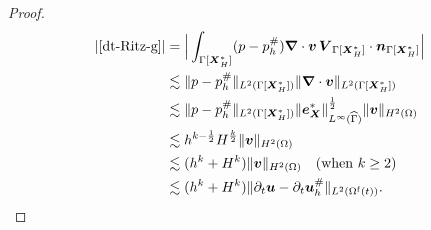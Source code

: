 \documentclass[11pt,reqno]{amsart}
\theoremstyle{definition}
\theoremstyle{plain}
\numberwithin{theorem}{section}
\numberwithin{proposition}{section}
\numberwithin{lemma}{section}
\numberwithin{equation}{section}
\newcommand{\bs}[1]{\boldsymbol{#1}}
\newcommand{\uu}[1]  {{\bs{#1}} }
\newcommand{\grad}   { \uu{\nabla}    }
\def\d{\mathrm{d}}
\renewcommand{\(}{\bigl(}
\renewcommand{\)}{\bigr)}
\begin{document}
\begin{proof}
\begin{align*}
|\eqref{dt-Ritz-g}|
&=\Big|\int_{\Gamma[{\bs X}_H^*]} ( p - p_h^\# ) \grad\cdot{\bs v}\, {\bs V}_{\Gamma[\bs X_H^*]}\cdot{\bs n}_{\Gamma[\bs X_H^*]} 
\Big| \\
&\lesssim \|p - p_h^\# \|_{L^2(\Gamma[\bs X_H^*])} \|\grad\cdot{\bs v}\|_{L^2(\Gamma[\bs X_H^{*}])} \\ 
&\lesssim \|p - p_h^\# \|_{L^2(\Gamma[\bs X_H^*])} \|{\bs e}_{\bs X}^*\|_{L^\infty(\widehat\Gamma)}^{\frac12} \|{\bs v}\|_{H^2(\Omega)}  \\ 
&\lesssim h^{k-\frac12} H^{\frac{k}{2}}\|{\bs v}\|_{H^2(\Omega)} \\
&\lesssim (h^k+H^k) \|{\bs v}\|_{H^2(\Omega)}
\quad\mbox{(when $k\ge 2$)} \notag\\
&\lesssim (h^k + H^k)  \|\partial_t{\bs u}-\partial_t{\bs u}_h^\#\|_{L^2(\Omega^{\rm f}(t))} . 
\end{align*}


\end{proof}
\end{document}
